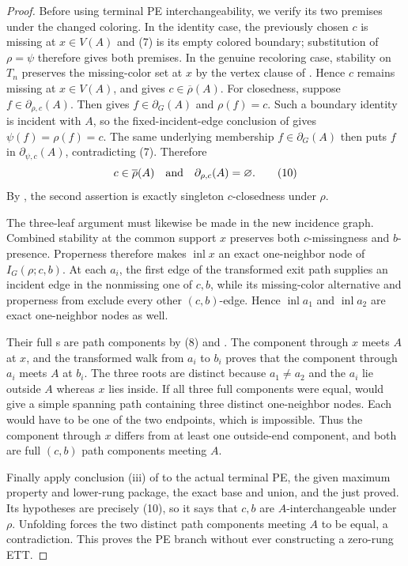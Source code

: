 \begin{proof}
Before using terminal PE interchangeability, we verify its two premises
under the changed coloring.  In the identity case, the previously chosen
$c$ is missing at $x\in V(A)$ and (7) is its empty colored boundary;
substitution of $\rho=\psi$ therefore gives both premises.  In the
genuine recoloring case, stability on
$T_n$ preserves the missing-color set at $x$ by the vertex clause of
.  Hence $c$ remains missing at $x\in V(A)$, and
 gives
$c\in\overline\rho(A)$.  For closedness, suppose
$f\in\partial_{\rho,c}(A)$.  Then  gives
$f\in\partial_G(A)$ and $\rho(f)=c$.  Such a boundary identity is
incident with $A$, so the fixed-incident-edge conclusion of
 gives
$\psi(f)=\rho(f)=c$.  The same underlying membership
$f\in\partial_G(A)$ then puts $f$ in
$\partial_{\psi,c}(A)$, contradicting (7).  Therefore
\[
 c\in\overline\rho(A)
 \quad\hbox{and}\quad
 \partial_{\rho,c}(A)=\varnothing.                  \tag{10}
\]
By , the second assertion is exactly
singleton $c$-closedness under $\rho$.

The three-leaf argument must likewise be made in the new incidence graph.
Combined stability at the common support $x$ preserves both $c$-missingness
and $b$-presence.  Properness therefore makes
$\operatorname{inl}x$ an exact one-neighbor node of
$I_G(\rho;c,b)$.  At each $a_i$, the first edge of the transformed exit
path supplies an incident edge in the nonmissing one of $c,b$, while its
missing-color alternative and properness from
 exclude every other $(c,b)$-edge.  Hence
$\operatorname{inl}a_1$ and
$\operatorname{inl}a_2$ are exact one-neighbor nodes as well.

Their full s are path components by (8) and
.  The component through $x$ meets $A$ at
$x$, and the transformed walk from $a_i$ to $b_i$ proves that the
component through $a_i$ meets $A$ at $b_i$.  The three roots are distinct
because $a_1\ne a_2$ and the $a_i$ lie outside $A$ whereas $x$ lies
inside.  If all three full components were equal,
 would give a simple spanning path
containing three distinct one-neighbor nodes.  Each would have to be one
of the two endpoints, which is impossible.  Thus the component through
$x$ differs from at least one outside-end component, and both are full
$(c,b)$ path components meeting $A$.

Finally apply conclusion (iii) of  to the actual
terminal PE, the given maximum property and lower-rung package, the exact
base and union, and the  just proved.
Its hypotheses are precisely (10), so it says that $c,b$ are
$A$-interchangeable under $\rho$.  Unfolding
 forces the two distinct path components
meeting $A$ to be equal, a contradiction.  This proves the PE branch
without ever constructing a zero-rung ETT.
\end{proof}
